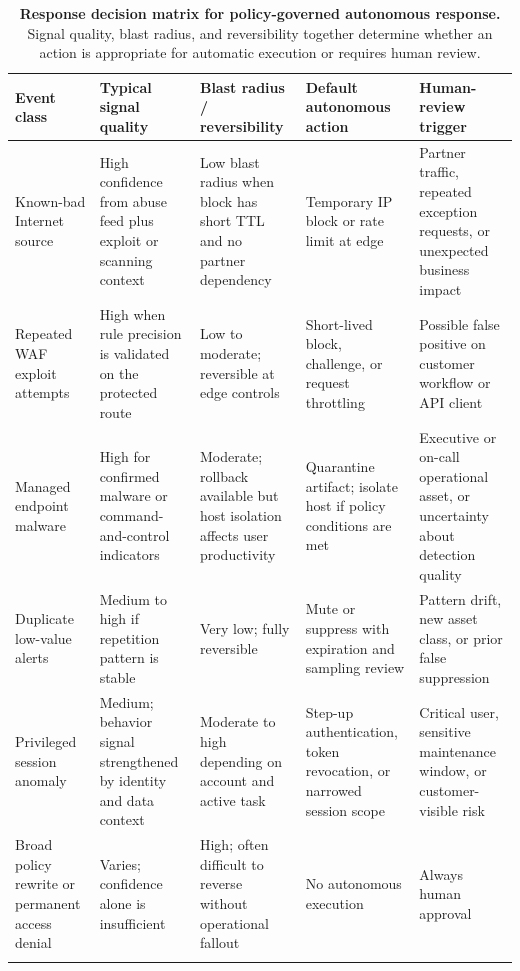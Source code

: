 \documentclass[unnumsec,webpdf,contemporary,large]{oup-authoring-template}
\theoremstyle{thmstyleone}
\theoremstyle{thmstyletwo}
\theoremstyle{thmstylethree}
\begin{document}
\begin{table}[t]
\caption[]{\textbf{Response decision matrix for policy-governed autonomous response.}
Signal quality, blast radius, and reversibility together determine whether an action is
appropriate for automatic execution or requires human review.}
\label{tab:decision_matrix}
\scriptsize
\setlength{\tabcolsep}{3pt}
\renewcommand{\arraystretch}{1.2}
\begin{tabular}{p{1.8cm}p{2.3cm}p{2.3cm}p{2.5cm}p{2.5cm}}
\toprule
\textbf{Event class} & \textbf{Typical signal quality} & \textbf{Blast radius / reversibility} &
\textbf{Default autonomous action} & \textbf{Human-review trigger} \\
\midrule
Known-bad Internet source & High confidence from abuse feed plus exploit or
scanning context & Low blast radius when block has short TTL and no partner
dependency & Temporary IP block or rate limit at edge &
Partner traffic, repeated exception requests, or unexpected business impact \\[4pt]
Repeated WAF exploit attempts & High when rule precision is validated on the
protected route & Low to moderate; reversible at edge controls &
Short-lived block, challenge, or request throttling &
Possible false positive on customer workflow or API client \\[4pt]
Managed endpoint malware & High for confirmed malware or command-and-control
indicators & Moderate; rollback available but host isolation affects user productivity &
Quarantine artifact; isolate host if policy conditions are met &
Executive or on-call operational asset, or uncertainty about detection quality \\[4pt]
Duplicate low-value alerts & Medium to high if repetition pattern is stable &
Very low; fully reversible &
Mute or suppress with expiration and sampling review &
Pattern drift, new asset class, or prior false suppression \\[4pt]
Privileged session anomaly & Medium; behavior signal strengthened by identity
and data context & Moderate to high depending on account and active task &
Step-up authentication, token revocation, or narrowed session scope &
Critical user, sensitive maintenance window, or customer-visible risk \\[4pt]
Broad policy rewrite or permanent access denial & Varies; confidence alone
is insufficient & High; often difficult to reverse without operational fallout &
No autonomous execution & Always human approval \\
\botrule
\end{tabular}
\end{table}
\end{document}
